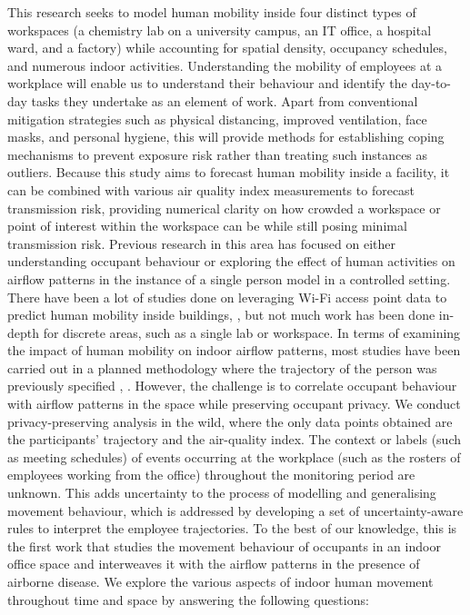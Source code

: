 \documentclass[acmtog]{acmart}
\begin{document}
This research seeks to model human mobility inside four distinct types of workspaces (a chemistry lab on a university campus, an IT office, a hospital ward, and a factory) while accounting for spatial density, occupancy schedules, and numerous indoor activities. Understanding the mobility of employees at a workplace will enable us to understand their behaviour and identify the day-to-day tasks they undertake as an element of work. Apart from conventional mitigation strategies such as physical distancing, improved ventilation, face masks, and personal hygiene, this will provide methods for establishing coping mechanisms to prevent exposure risk rather than treating such instances as outliers. Because this study aims to forecast human mobility inside a facility, it can be combined with various air quality index measurements to forecast transmission risk, providing numerical clarity on how crowded a workspace or point of interest within the workspace can be while still posing minimal transmission risk. Previous research in this area has focused on either understanding occupant behaviour or exploring the effect of human activities on airflow patterns in the instance of a single person model in a controlled setting. There have been a lot of studies done on leveraging Wi-Fi access point data to predict human mobility inside buildings, \cite{qian2016decimeter}, \cite{meneses2012large} but not much work has been done in-depth for discrete areas, such as a single lab or workspace. In terms of examining the impact of human mobility on indoor airflow patterns, most studies have been carried out in a planned methodology where the trajectory of the person was previously specified \cite{mahaki2021comparing}, \cite{wu2022transient}. However, the challenge is to correlate occupant behaviour with airflow patterns in the space while preserving occupant privacy. We conduct privacy-preserving analysis in the wild, where the only data points obtained are the participants' trajectory and the air-quality index. The context or labels (such as meeting schedules) of events occurring at the workplace (such as the rosters of employees working from the office) throughout the monitoring period are unknown. This adds uncertainty to the process of modelling and generalising movement behaviour, which is addressed by developing a set of uncertainty-aware rules to interpret the employee trajectories. To the best of our knowledge, this is the first work that studies the movement behaviour of occupants in an indoor office space and interweaves it with the airflow patterns in the presence of airborne disease. We explore the various aspects of indoor human movement throughout time and space by answering the following questions:
\end{document}
